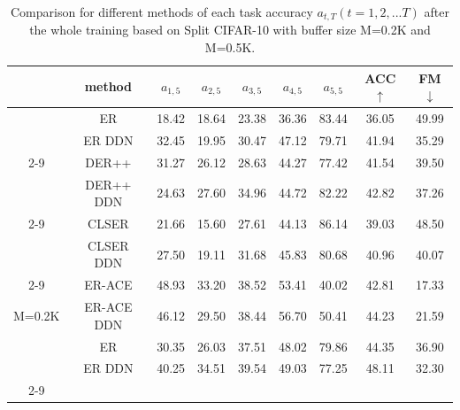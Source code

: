 \documentclass[table, xcdraw]{article}
\theoremstyle{plain}
\theoremstyle{definition}
\theoremstyle{remark}
\begin{document}
\begin{table}[!htp]
\caption{Comparison for different methods of each task accuracy $a_{t,T}(t=1,2,...T)$ after the whole training based on Split CIFAR-10 with buffer size M=0.2K and M=0.5K.}
\label{each task}
\begin{center}
\centering
    \begin{tabular}{ccccccccc}
\hline
  & method & $a_{1,5}$ & $a_{2,5}$ & $a_{3,5}$ & $a_{4,5}$ & $a_{5,5}$ & ACC$\uparrow$ & FM$\downarrow$ \\ \hline
 & ER & 18.42 & 18.64 & 23.38 & 36.36 & 83.44 & 36.05 & 49.99 \\
 & \cellcolor[HTML]{D8D8D8}ER DDN & \cellcolor[HTML]{D8D8D8}32.45 & \cellcolor[HTML]{D8D8D8}19.95 & \cellcolor[HTML]{D8D8D8}30.47 & \cellcolor[HTML]{D8D8D8}47.12 & \cellcolor[HTML]{D8D8D8}79.71 & \cellcolor[HTML]{D8D8D8}41.94 & \cellcolor[HTML]{D8D8D8}35.29 \\ \cline{2-9}
 & DER++ & 31.27 & 26.12 & 28.63 & 44.27 & 77.42 & 41.54 & 39.50 \\
 & \cellcolor[HTML]{D8D8D8}DER++ DDN & \cellcolor[HTML]{D8D8D8}24.63 & \cellcolor[HTML]{D8D8D8}27.60 & \cellcolor[HTML]{D8D8D8}34.96 & \cellcolor[HTML]{D8D8D8}44.72 & \cellcolor[HTML]{D8D8D8}82.22 & \cellcolor[HTML]{D8D8D8}42.82 & \cellcolor[HTML]{D8D8D8}37.26 \\ \cline{2-9}
 & CLSER & 21.66 & 15.60 & 27.61 & 44.13 & 86.14 & 39.03 & 48.50 \\
 & \cellcolor[HTML]{D8D8D8}CLSER DDN & \cellcolor[HTML]{D8D8D8}27.50 & \cellcolor[HTML]{D8D8D8}19.11 & \cellcolor[HTML]{D8D8D8}31.68 & \cellcolor[HTML]{D8D8D8}45.83 & \cellcolor[HTML]{D8D8D8}80.68 & \cellcolor[HTML]{D8D8D8}40.96 & \cellcolor[HTML]{D8D8D8}40.07 \\ \cline{2-9}
 & ER-ACE & 48.93 & 33.20 & 38.52 & 53.41 & 40.02 & 42.81 & 17.33 \\
\multirow{-9}{*}{M=0.2K} & \cellcolor[HTML]{D8D8D8}ER-ACE DDN & \cellcolor[HTML]{D8D8D8}46.12 & \cellcolor[HTML]{D8D8D8}29.50 & \cellcolor[HTML]{D8D8D8}38.44 & \cellcolor[HTML]{D8D8D8}56.70 & \cellcolor[HTML]{D8D8D8}50.41 & \cellcolor[HTML]{D8D8D8}44.23 & \cellcolor[HTML]{D8D8D8}21.59 \\ \hline
 & ER & 30.35 & 26.03 & 37.51 & 48.02 & 79.86 & 44.35 & 36.90 \\
 & \cellcolor[HTML]{D8D8D8}ER DDN & \cellcolor[HTML]{D8D8D8}40.25 & \cellcolor[HTML]{D8D8D8}34.51 & \cellcolor[HTML]{D8D8D8}39.54 & \cellcolor[HTML]{D8D8D8}49.03 & \cellcolor[HTML]{D8D8D8}77.25 & \cellcolor[HTML]{D8D8D8}48.11 & \cellcolor[HTML]{D8D8D8}32.30 \\ \cline{2-9}

\end{tabular}
\end{center}
\end{table}
\end{document}
